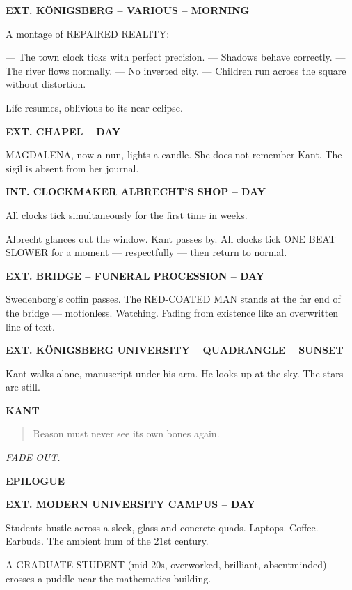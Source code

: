 \documentclass[12pt]{article}
\newcommand{\Scene}[1]{\vspace{1.2em}\textbf{#1}\vspace{0.8em}}
\newcommand{\Character}[1]{\vspace{0.8em}\textbf{#1}\vspace{0.4em}}
\newenvironment{Dialogue}{\begin{quote}\begin{RaggedRight}}{\end{RaggedRight}\end{quote}}
\newcommand{\Action}[1]{\vspace{0.4em}#1\vspace{0.4em}}
\newcommand{\Transition}[1]{\hfill\textit{#1}\vspace{1em}}
\begin{document}
\Scene{EXT. KÖNIGSBERG – VARIOUS – MORNING}

\Action{A montage of REPAIRED REALITY:}

\Action{— The town clock ticks with perfect precision.  
— Shadows behave correctly.  
— The river flows normally.  
— No inverted city.  
— Children run across the square without distortion.}

\Action{Life resumes, oblivious to its near eclipse.}

\Scene{EXT. CHAPEL – DAY}

\Action{MAGDALENA, now a nun, lights a candle.  
She does not remember Kant.  
The sigil is absent from her journal.}

\Scene{INT. CLOCKMAKER ALBRECHT’S SHOP – DAY}

\Action{All clocks tick simultaneously for the first time in weeks.}

\Action{Albrecht glances out the window.  
Kant passes by.  
All clocks tick ONE BEAT SLOWER for a moment —  
respectfully —  
then return to normal.}

\Scene{EXT. BRIDGE – FUNERAL PROCESSION – DAY}

\Action{Swedenborg’s coffin passes.  
The RED-COATED MAN stands at the far end of the bridge —  
motionless.  
Watching.  
Fading from existence like an overwritten line of text.}

\Scene{EXT. KÖNIGSBERG UNIVERSITY – QUADRANGLE – SUNSET}

\Action{Kant walks alone, manuscript under his arm.  
He looks up at the sky.  
The stars are still.}

\Character{KANT}
\begin{Dialogue}
Reason must never see its own bones again.
\end{Dialogue}

\Transition{FADE OUT.}


\newpage
\begin{center}
{\Large\bfseries EPILOGUE}
\end{center}
\newpage

\Scene{EXT. MODERN UNIVERSITY CAMPUS – DAY}

\Action{Students bustle across a sleek, glass-and-concrete quads.  
Laptops. Coffee. Earbuds. The ambient hum of the 21st century.}

\Action{A GRADUATE STUDENT (mid-20s, overworked, brilliant, absentminded)  
crosses a puddle near the mathematics building.}
\end{document}
